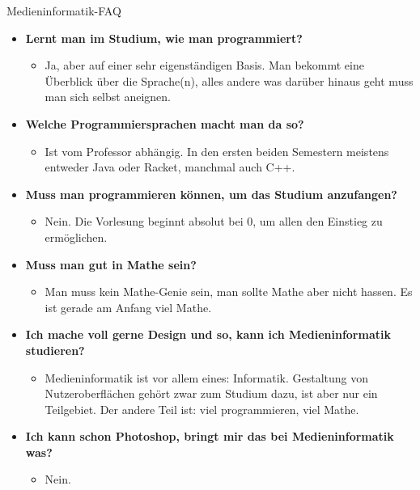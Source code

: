 \begin{LARGE}
	Medieninformatik-FAQ
\end{LARGE}
\begin{large}
\begin{itemize}
		\item \textbf{Lernt man im Studium, wie man programmiert?}
		\begin{itemize}
			\item Ja, aber auf einer sehr eigenständigen Basis. Man bekommt eine Überblick über die Sprache(n), alles andere was darüber hinaus geht muss man sich selbst aneignen.
		\end{itemize}
	
		\item \textbf{Welche Programmiersprachen macht man da so?}
		\begin{itemize}
			\item Ist vom Professor abhängig. In den ersten beiden Semestern meistens entweder Java oder Racket, manchmal auch C++.
		\end{itemize}
	
		\item \textbf{Muss man programmieren können, um das Studium anzufangen?}
		\begin{itemize}
			\item Nein. Die Vorlesung beginnt absolut bei 0, um allen den Einstieg zu ermöglichen.
		\end{itemize}
	
		\item \textbf{Muss man gut in Mathe sein?}
		\begin{itemize}
			\item Man muss kein Mathe-Genie sein, man sollte Mathe aber nicht hassen. Es ist gerade am Anfang viel Mathe.
		\end{itemize}

	\item \textbf{Ich mache voll gerne Design und so, kann ich Medieninformatik studieren?}
	\begin{itemize}
		\item Medieninformatik ist vor allem eines: Informatik. Gestaltung von Nutzeroberflächen gehört zwar zum Studium dazu, ist aber nur ein Teilgebiet. Der andere Teil ist: viel programmieren, viel Mathe.
	\end{itemize}

\item \textbf{Ich kann schon Photoshop, bringt mir das bei Medieninformatik was?}
\begin{itemize}
	\item Nein.
\end{itemize}


\end{itemize}
\end{large}
